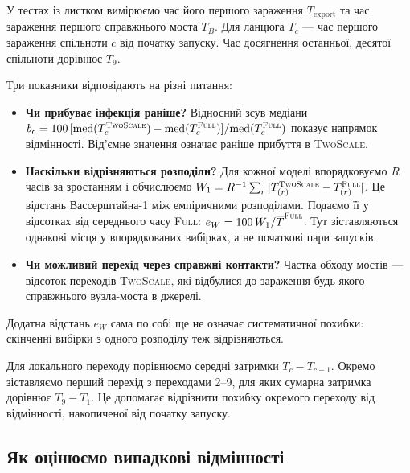 \documentclass[a4paper,fleqn]{cas-sc}
\newcommand{\Full}{\textup{\textsc{Full}}}
\newcommand{\TS}{\textup{\textsc{TwoScale}}}
\newcommand{\eW}{e_{W}}
\begin{document}
У тестах із листком вимірюємо час його першого зараження $T_{\mathrm{export}}$ та час зараження першого справжнього моста $T_B$. Для ланцюга $T_c$ --- час першого зараження спільноти $c$ від початку запуску. Час досягнення останньої, десятої спільноти дорівнює $T_9$.
\par Три показники відповідають на різні питання:
\begin{itemize}
\item \textbf{Чи прибуває інфекція раніше?} Відносний зсув медіани $b_c=100\,[\mathrm{med}(T^{\TS}_c)-\mathrm{med}(T^{\Full}_c)]/\mathrm{med}(T^{\Full}_c)$ показує напрямок відмінності. Від'ємне значення означає раніше прибуття в \TS{}.
\item \textbf{Наскільки відрізняються розподіли?} Для кожної моделі впорядковуємо $R$ часів за зростанням і обчислюємо $W_1=R^{-1}\sum_r|T^{\TS}_{(r)}-T^{\Full}_{(r)}|$. Це відстань Вассерштайна-1 між емпіричними розподілами. Подаємо її у відсотках від середнього часу \Full{}: $\eW=100\,W_1/\overline{T}^{\Full}$. Тут зіставляються однакові місця у впорядкованих вибірках, а не початкові пари запусків.
\item \textbf{Чи можливий перехід через справжні контакти?} Частка обходу мостів --- відсоток переходів \TS{}, які відбулися до зараження будь-якого справжнього вузла-моста в джерелі.
\end{itemize}
Додатна відстань $\eW$ сама по собі ще не означає систематичної похибки: скінченні вибірки з одного розподілу теж відрізняються.
\par Для локального переходу порівнюємо середні затримки $T_c-T_{c-1}$. Окремо зіставляємо перший перехід з переходами 2--9, для яких сумарна затримка дорівнює $T_9-T_1$. Це допомагає відрізнити похибку окремого переходу від відмінності, накопиченої від початку запуску.

\subsection{Як оцінюємо випадкові відмінності}
\end{document}
